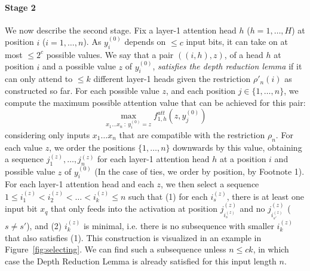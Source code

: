 \documentclass[11pt,a4paper]{article}
\begin{document}
\paragraph{Stage 2}
We now describe the second stage.
Fix a layer-1 attention head $h$ ($h=1,\dots, H$) at position $i$ ($i=1, \dots, n$).
As $y^{(0)}_i$ depends on $\leq c$ input bits, it can take on at most $\leq 2^c$ possible values.
We say that a pair $((i,h),z)$, of a head $h$ at position $i$ and a possible value $z$ of $y^{(0)}_i$, \emph{satisfies the depth reduction lemma} if it can only attend to $\leq k$ different layer-1 heads given the restriction $\rho'_n(i)$ as constructed so far.
For each possible value $z$,  and each position $j \in \{1, \dots, n\}$, we compute the maximum possible attention value that can be achieved for this pair:
\begin{equation}
\max_{x_1\dots x_n\ :\ y^{(0)}_i=z} f^{att}_{1,h}(z, y^{(0)}_j)
\end{equation}
considering only inputs $x_1\dots x_n$ that are compatible with the restriction $\rho_n$.
For each value $z$, we order the positions $\{1, \dots, n\}$ downwards by this value, obtaining a sequence $j_1^{(z)}, \dots, j_n^{(z)}$ for each layer-1 attention head $h$ at a position $i$ and possible value $z$ of $y^{(0)}_i$ (In the case of ties, we order by  position, by Footnote 1).
For each layer-1 attention head and each $z$, we then select a sequence $1 \leq i_1^{(z)} < i_2^{(z)} < \dots < i_{k}^{(z)} \leq n$ such that (1) for each $i_s^{(z)}$, there is at least one input bit $x_q$ that only feeds into the activation at position $j_{i_s^{(z)}}^{(z)}$ and no $j_{i_{s'}^{(z)}}^{(z)}$ ($s\neq s'$), and (2) $i_{k}^{(z)}$ is minimal, i.e. there is no subsequence with smaller $i_{k}^{(z)}$ that also satisfies (1).
This construction is visualized in an example in Figure~\ref{fig:selecting}.
We can find such a subsequence unless $n \leq ck$, in which case the Depth Reduction Lemma is already satisfied for this input length $n$.
\end{document}
